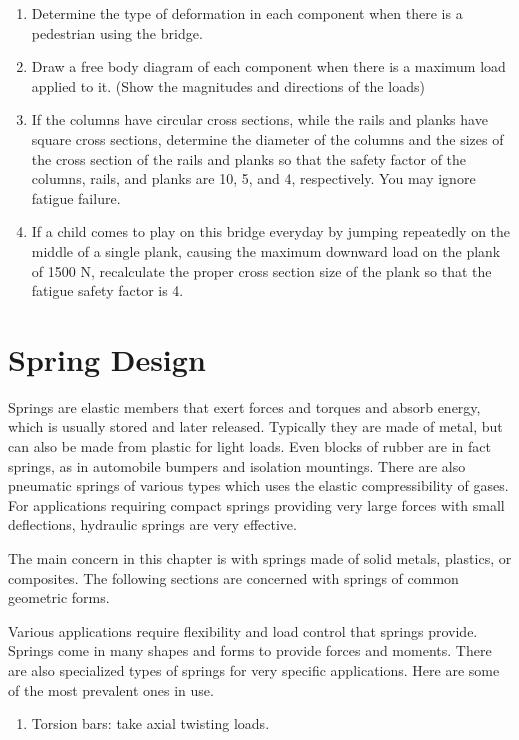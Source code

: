 \documentclass[a4paper,openany,nobib]{tufte-book}
\begin{document}
{{\begin{enumerate}
\item Determine the type of deformation in each component when there is a
pedestrian using the bridge.

\item Draw a free body diagram of each component when there is a maximum
load applied to it. (Show the magnitudes and directions of the loads)

\item If the columns have circular cross sections, while the rails and
planks have square cross sections, determine the diameter of the
columns and the sizes of the cross section of the rails and planks so
that the safety factor of the columns, rails, and planks are 10, 5,
and 4, respectively. You may ignore fatigue failure.

\item If a child comes to play on this bridge everyday by jumping
repeatedly on the middle of a single plank, causing the maximum
downward load on the plank of 1500 N, recalculate the proper cross
section size of the plank so that the fatigue safety factor is 4.
\end{enumerate}

\section{Spring Design}
\label{spring-design}
Springs are elastic members that exert forces and torques and absorb
energy, which is usually stored and later released. Typically they are
made of metal, but can also be made from plastic for light loads. Even
blocks of rubber are in fact springs, as in automobile bumpers and
isolation mountings. There are also pneumatic springs of various types
which uses the elastic compressibility of gases. For applications
requiring compact springs providing very large forces with small
deflections, hydraulic springs are very effective.

The main concern in this chapter is with springs made of solid metals,
plastics, or composites. The following sections are concerned with
springs of common geometric forms.

Various applications require flexibility and load control that springs
provide. Springs come in many shapes and forms to provide forces and
moments. There are also specialized types of springs for very specific
applications. Here are some of the most prevalent ones in use.

\begin{enumerate}
\item Torsion bars: take axial twisting loads.


\end{enumerate}}}
\end{document}

